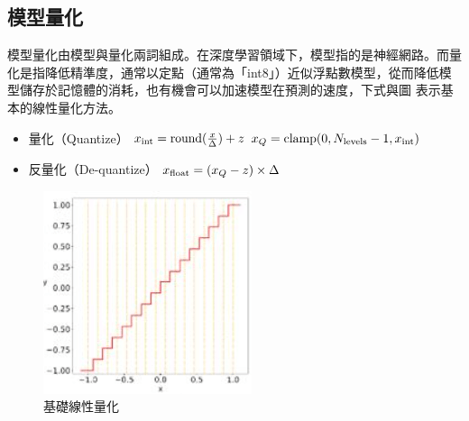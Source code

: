 \subsection{模型量化}
模型量化由模型與量化兩詞組成。在深度學習領域下，模型指的是神經網路。而量化是指降低精準度，通常以定點（通常為「int8」）近似浮點數模型，從而降低模型儲存於記憶體的消耗，也有機會可以加速模型在預測的速度，下式與圖 表示基本的線性量化方法。

\begin{itemize}
    \item 量化（Quantize）
    \subitem $x_\textup{int} = \textup{round}(\frac{x}{\Delta})+z$
    \subitem $x_Q = \textup{clamp}(0,N_\textup{levels}-1,x_\textup{int})$
    \item 反量化（De-quantize）
    \subitem $x_\textup{float} = (x_Q-z)\times\Delta$
\end{itemize}
\begin{figure}[htbp]
    \hfil
    \begin{minipage}[t]{0.4\textwidth}
        \includegraphics[width=\textwidth]{./figures/chapter02_method/quantization1.png}
        \caption {基礎線性量化}
        \label{quantization1}
    \end{minipage}
    \hfil
\end{figure}

